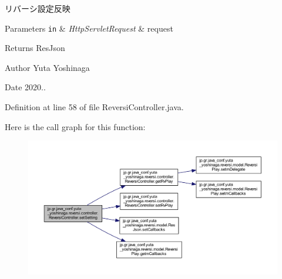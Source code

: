 リバーシ設定反映 


\begin{DoxyParams}[1]{Parameters}
\mbox{\tt in}  & {\em Http\+Servlet\+Request} & request \\
\hline
\end{DoxyParams}
\begin{DoxyReturn}{Returns}
Res\+Json 
\end{DoxyReturn}
\begin{DoxyAuthor}{Author}
Yuta Yoshinaga 
\end{DoxyAuthor}
\begin{DoxyDate}{Date}
2020.. 
\end{DoxyDate}


Definition at line 58 of file Reversi\+Controller.\+java.

Here is the call graph for this function\+:
\nopagebreak
\begin{figure}[H]
\begin{center}
\leavevmode
\includegraphics[width=350pt]{classjp_1_1gr_1_1java__conf_1_1yuta__yoshinaga_1_1reversi_1_1controller_1_1_reversi_controller_aad191800cbf367f237bf6160037255e8_cgraph}
\end{center}
\end{figure}
\mbox{\label{classjp_1_1gr_1_1java__conf_1_1yuta__yoshinaga_1_1reversi_1_1controller_1_1_reversi_controller_ac3cff78c16b0190fd744317a8c1a07d6}} 
